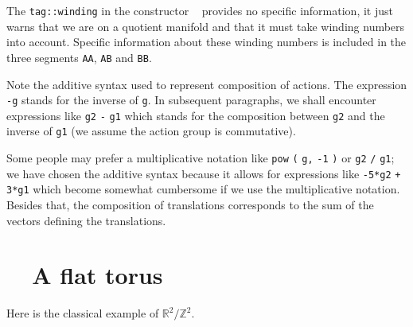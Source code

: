 The {\small\tt\textcolor{tag}{tag}::winding} in the constructor {\small\tt{}
} provides no specific information, it just warns {\maniFEM} that
we are on a quotient manifold and that it must take winding numbers into account.
Specific information about these winding numbers is included in the three segments
{\small\tt AA}, {\small\tt AB} and {\small\tt BB}.

Note the additive syntax used to represent composition of actions.
The expression {\small\tt -g} stands for the inverse of {\small\tt g}.
In subsequent paragraphs, we shall encounter expressions like
{\small\tt g2} {\small\tt -} {\small\tt g1} which stands for the composition between
{\small\tt g2} and the inverse of {\small\tt g1} (we assume the action group is commutative).

Some people may prefer a multiplicative notation like {\small\tt pow} {\small\tt (} {\small\tt g,}
{\small\tt -1} {\small\tt )} or {\small\tt g2} {\small\tt /} {\small\tt g1};
we have chosen the additive syntax because it allows for expressions like {\small\tt -5*g2}
{\small\tt +} {\small\tt 3*g1} which become somewhat cumbersome if we use
the multiplicative notation.
Besides that, the composition of translations corresponds to the sum of the vectors
defining the translations.


\section{~~A flat torus}\label{\numb section 7.\numb parag 4}

Here is the classical example of $ \mathbb{R}^2/{\mathbb Z}^2 $.

